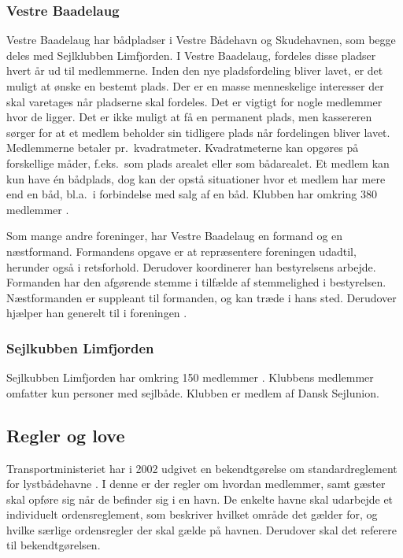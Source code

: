 \subsubsection{Vestre Baadelaug}
Vestre Baadelaug har bådpladser i Vestre Bådehavn og Skudehavnen, som begge deles med Sejlklubben Limfjorden. I Vestre Baadelaug, fordeles disse pladser hvert år ud til medlemmerne. Inden den nye pladsfordeling bliver lavet, er det muligt at ønske en bestemt plads. Der er en masse menneskelige interesser der skal varetages når pladserne skal fordeles. Det er vigtigt for nogle medlemmer hvor de ligger. Det er ikke muligt at få en permanent plads, men kassereren sørger for at et medlem beholder sin tidligere plads når fordelingen bliver lavet. Medlemmerne betaler pr.\ kvadratmeter. Kvadratmeterne kan opgøres på forskellige måder, f.eks.\ som plads arealet eller som bådarealet. Et medlem kan kun have én bådplads, dog kan der opstå situationer hvor et medlem har mere end en båd, bl.a.\ i forbindelse med salg af en båd. Klubben har omkring 380 medlemmer \cite{int_vb_sl}.

Som mange andre foreninger, har Vestre Baadelaug en formand og en næstformand. Formandens opgave er at repræsentere foreningen udadtil, herunder også i retsforhold. Derudover koordinerer han bestyrelsens arbejde. Formanden har den afgørende stemme i tilfælde af stemmelighed i bestyrelsen. Næstformanden er suppleant til formanden, og kan træde i hans sted. Derudover hjælper han generelt til i foreningen \cite{vestre_vedtagter}.


\subsubsection{Sejlkubben Limfjorden}
Sejlkubben Limfjorden har omkring 150 medlemmer \cite{int_vb_sl}. Klubbens medlemmer omfatter kun personer med sejlbåde. Klubben er medlem af Dansk Sejlunion.


\subsection{Regler og love}
Transportministeriet har i 2002 udgivet en bekendtgørelse om standardreglement for lystbådehavne \cite{standardreglement}. I denne er der regler om hvordan medlemmer, samt gæster skal opføre sig når de befinder sig i en havn. De enkelte havne skal udarbejde et individuelt ordensreglement, som beskriver hvilket område det gælder for, og hvilke særlige ordensregler der skal gælde på havnen. Derudover skal det referere til bekendtgørelsen.

